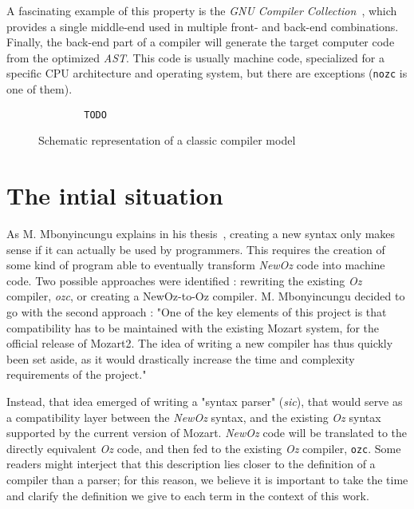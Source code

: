 A fascinating example of this property is the \textit{GNU Compiler Collection}~\cite{gcc}, which provides a single middle-end used in multiple front- and back-end combinations.\newline
Finally, the back-end part of a compiler will generate the target computer code from the optimized \textit{AST}.
This code is usually machine code, specialized for a specific CPU architecture and operating system, but there are exceptions (\texttt{nozc} is one of them).
\begin{figure}
    \begin{lstlisting}
        TODO
    \end{lstlisting}
    \caption{Schematic representation of a classic compiler model}
\end{figure}

\section{The intial situation}\label{sec:ch3-Parser}
As M. Mbonyincungu explains in his thesis~\cite{jpthesis}, creating a new syntax only makes sense if it can actually be used by programmers.
This requires the creation of some kind of program able to eventually transform \textit{NewOz} code into machine code.
Two possible approaches were identified : rewriting the existing \textit{Oz} compiler, \textit{ozc}, or creating a NewOz-to-Oz compiler.
M. Mbonyincungu decided to go with the second approach :
"One of the key elements of this project is that compatibility has to be maintained with the existing Mozart system, for the official release of Mozart2.
The idea of writing a new compiler has thus quickly been set aside, as it would drastically increase the time and complexity requirements of the project."~\cite{jpthesis}

Instead, that idea emerged of writing a "syntax parser" (\textit{sic}), that would serve as a compatibility layer between the \textit{NewOz} syntax, and the existing \textit{Oz} syntax supported by the current version of Mozart.
\textit{NewOz} code will be translated to the directly equivalent \textit{Oz} code, and then fed to the existing \textit{Oz} compiler, \texttt{ozc}.
Some readers might interject that this description lies closer to the definition of a compiler than a parser;
for this reason, we believe it is important to take the time and clarify the definition we give to each term in the context of this work.\newline

